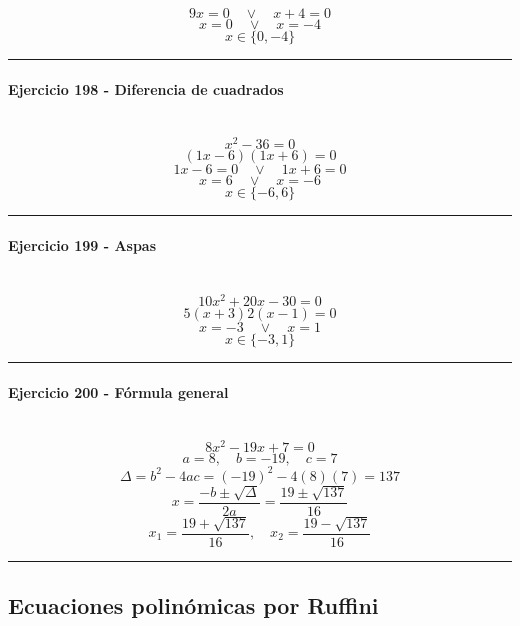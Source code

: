 \documentclass[10pt,a4paper]{article}
\newcommand{\res}[1]{\paragraph{#1}\mbox{}\\[-1.2em]}
\begin{document}
\[ 9x=0 \quad \vee \quad x+4=0 \]
\[ x=0 \quad \vee \quad x=-4 \]
\[ \boxed{x\in\{0,-4\}} \]
\vspace{1mm}\hrule\vspace{2mm}
\res{Ejercicio 198 - Diferencia de cuadrados}
\[ x^{2} - 36=0 \]
\[ (1x-6)(1x+6)=0 \]
\[ 1x-6=0 \quad \vee \quad 1x+6=0 \]
\[ x=6 \quad \vee \quad x=-6 \]
\[ \boxed{x\in\{-6,6\}} \]
\vspace{1mm}\hrule\vspace{2mm}
\res{Ejercicio 199 - Aspas}
\[ 10 x^{2} + 20 x - 30=0 \]
\[ 5(x+3)2(x-1)=0 \]
\[ x=-3 \quad \vee \quad x=1 \]
\[ \boxed{x\in\{-3,1\}} \]
\vspace{1mm}\hrule\vspace{2mm}
\res{Ejercicio 200 - Fórmula general}
\[ 8 x^{2} - 19 x + 7=0 \]
\[ a=8,\quad b=-19,\quad c=7 \]
\[ \Delta=b^2-4ac=(-19)^2-4(8)(7)=137 \]
\[ x=\frac{-b\pm\sqrt{\Delta}}{2a}=\frac{19\pm\sqrt{137}}{16} \]
\[ \boxed{x_1=\frac{19+\sqrt{137}}{16},\quad x_2=\frac{19-\sqrt{137}}{16}} \]
\vspace{1mm}\hrule\vspace{2mm}
\subsection{Ecuaciones polinómicas por Ruffini}
\end{document}
